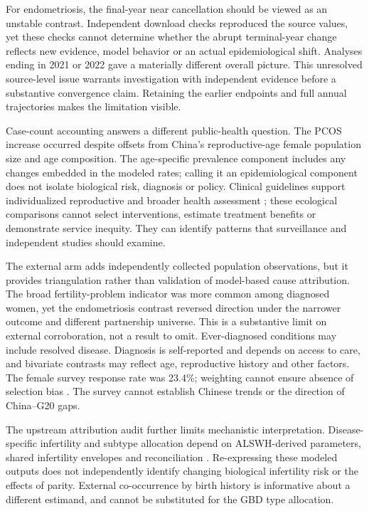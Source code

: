 \documentclass[11pt,a4paper]{article}
\begin{document}
For endometriosis, the final-year near cancellation should be viewed as an unstable contrast. Independent download checks reproduced the source values, yet these checks cannot determine whether the abrupt terminal-year change reflects new evidence, model behavior or an actual epidemiological shift. Analyses ending in 2021 or 2022 gave a materially different overall picture. This unresolved source-level issue warrants investigation with independent evidence before a substantive convergence claim. Retaining the earlier endpoints and full annual trajectories makes the limitation visible.

Case-count accounting answers a different public-health question. The PCOS increase occurred despite offsets from China's reproductive-age female population size and age composition. The age-specific prevalence component includes any changes embedded in the modeled rates; calling it an epidemiological component does not isolate biological risk, diagnosis or policy. Clinical guidelines support individualized reproductive and broader health assessment \cite{pcos,eshre}; these ecological comparisons cannot select interventions, estimate treatment benefits or demonstrate service inequity. They can identify patterns that surveillance and independent studies should examine.

The external arm adds independently collected population observations, but it provides triangulation rather than validation of model-based cause attribution. The broad fertility-problem indicator was more common among diagnosed women, yet the endometriosis contrast reversed direction under the narrower outcome and different partnership universe. This is a substantive limit on external corroboration, not a result to omit. Ever-diagnosed conditions may include resolved disease. Diagnosis is self-reported and depends on access to care, and bivariate contrasts may reflect age, reproductive history and other factors. The female survey response rate was 23.4\%; weighting cannot ensure absence of selection bias \cite{nsfg}. The survey cannot establish Chinese trends or the direction of China--G20 gaps.

The upstream attribution audit further limits mechanistic interpretation. Disease-specific infertility and subtype allocation depend on ALSWH-derived parameters, shared infertility envelopes and reconciliation \cite{gbd}. Re-expressing these modeled outputs does not independently identify changing biological infertility risk or the effects of parity. External co-occurrence by birth history is informative about a different estimand, and cannot be substituted for the GBD type allocation.
\end{document}
